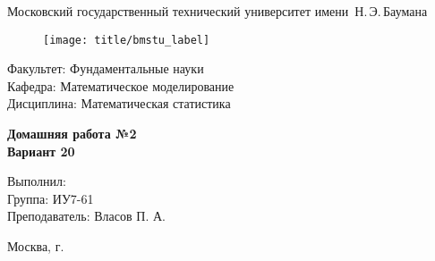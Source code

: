 
\thispagestyle{empty}

\begin{center}
	\Large
	Московский государственный технический университет имени~Н.\,Э.\,Баумана
\end{center}

\begin{figure}[h!]
	\begin{center}
		\texttt{[image: title/bmstu\_label]}
	\end{center}
\end{figure}

\hfill\begin{minipage}{0.77\textwidth}
{\large
\noindent
Факультет: Фундаментальные науки\\[2mm]
\noindent
Кафедра:  Математическое моделирование\\[2mm]
\noindent
Дисциплина: Математическая статистика 
\vspace{1.5cm}}
\end{minipage}
\vfill

\begin{center}
	\Large
	\textbf{Домашняя работа №2 \\Вариант 20}
\end{center}
\vfill

\hfill\begin{minipage}{0.6\textwidth}
	Выполнил: \\
	Группа: ИУ7-61\\
	Преподаватель: Власов П. А.
\end{minipage}
\vfill

\begin{center}
	Москва, \the\year\space г.
\end{center}